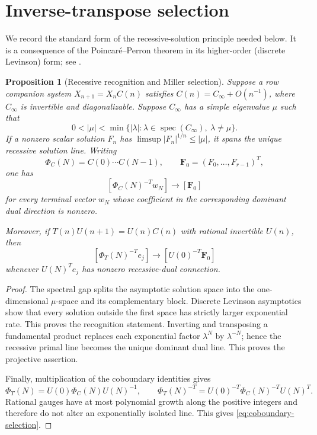 \documentclass[11pt]{article}
\newtheorem{proposition}[theorem]{Proposition}
\theoremstyle{remark}
\begin{document}
\section{Inverse-transpose selection}

We record the standard form of the recessive-solution principle
needed below.  It is a consequence of the Poincar\'e--Perron theorem
in its higher-order (discrete Levinson) form; see
\cite{WeinbaumCMF}.

\begin{proposition}[Recessive recognition and Miller selection]
\label{prop:miller}
Suppose a row companion system $X_{n+1}=X_nC(n)$ satisfies
$C(n)=C_\infty+O(n^{-1})$, where $C_\infty$ is invertible and
diagonalizable.  Suppose $C_\infty$ has a simple eigenvalue $\mu$
such that
\[
 0<|\mu|<\min\{|\lambda|:\lambda\in\operatorname{spec}(C_\infty),
 \ \lambda\ne\mu\}.
\]
If a nonzero scalar solution $F_n$ has
$\limsup |F_n|^{1/n}\leq|\mu|$, it spans the unique recessive
solution line.  Writing
\[
 \Phi_C(N)=C(0)\cdots C(N-1),\qquad
 \mathbf F_0=(F_0,\ldots,F_{r-1})^T,
\]
one has
\[
 [\Phi_C(N)^{-T}w_N]\longrightarrow[\mathbf F_0]
\]
for every terminal vector $w_N$ whose coefficient in the
corresponding dominant dual direction is nonzero.

Moreover, if $T(n)U(n+1)=U(n)C(n)$ with rational invertible $U(n)$,
then
\begin{equation}\label{eq:coboundary-selection}
 [\Phi_T(N)^{-T}e_j]\longrightarrow[U(0)^{-T}\mathbf F_0]
\end{equation}
whenever $U(N)^Te_j$ has nonzero recessive-dual connection.
\end{proposition}

\begin{proof}
The spectral gap splits the asymptotic solution space into the
one-dimensional $\mu$-space and its complementary block.  Discrete
Levinson asymptotics show that every solution outside the first
space has strictly larger exponential rate.  This proves the
recognition statement.  Inverting and transposing a fundamental
product replaces each exponential factor $\lambda^N$ by
$\lambda^{-N}$; hence the recessive primal line becomes the unique
dominant dual line.  This proves the projective assertion.

Finally, multiplication of the coboundary identities gives
\[
 \Phi_T(N)=U(0)\Phi_C(N)U(N)^{-1},\qquad
 \Phi_T(N)^{-T}=U(0)^{-T}\Phi_C(N)^{-T}U(N)^T.
\]
Rational gauges have at most polynomial growth along the positive
integers and therefore do not alter an exponentially isolated line.
This gives \eqref{eq:coboundary-selection}.
\end{proof}
\end{document}
